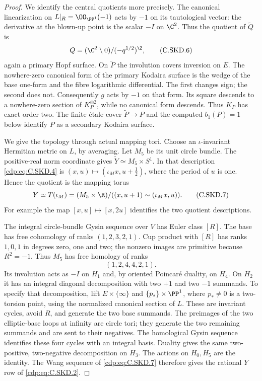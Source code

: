 \begin{proof}
We identify the central quotients more precisely.
The canonical linearization on
$L|_R=\OO_{\PP^1}(-1)$ acts by $-1$ on its
tautological vector: the derivative at the
blown-up point is the scalar $-I$ on $\C^2$.
Thus the quotient of $\widetilde Q$ is
\[
                 Q=(\C^2\setminus0)/
                         (-q^{1/2})^{\Z},              \tag{C.SKD.6}\label{cdp:eq:C.SKD.6}
\]
again a primary Hopf surface. On $\widetilde P$
the involution covers inversion on $E$.
The nowhere-zero canonical form of the primary
Kodaira surface is the wedge of the base
one-form and the fibre logarithmic differential.
The first changes sign; the second does not.
Consequently $g$ acts by $-1$ on that form.
Its square descends to a nowhere-zero section
of $K_P^{\otimes2}$, while no canonical form
descends. Thus $K_P$ has exact order two.
The finite \'etale cover $\widetilde P\to P$
and the computed $b_1(P)=1$ below identify $P$
as a secondary Kodaira surface.

We give the topology through actual mapping
tori. Choose an $\iota$-invariant Hermitian
metric on $L$, by averaging. Let $M_5$ be its
unit circle bundle. The positive-real norm
coordinate gives
$\widetilde Y\simeq M_5\times S^1$. In that
description \eqref{cdp:eq:C.SKD.4} is
$(x,u)\mapsto(\iota_Mx,u+\tfrac12)$, where
the period of $u$ is one. Hence the quotient
is the mapping torus
\[
          Y\simeq T(\iota_M)
            =(M_5\times\R)/
               ((x,u+1)\sim(\iota_Mx,u)).               \tag{C.SKD.7}\label{cdp:eq:C.SKD.7}
\]
For example the map $[x,u]\mapsto[x,2u]$
identifies the two quotient descriptions.

The integral circle-bundle Gysin sequence
over $V$ has Euler class $[R]$. The base has
free cohomology of ranks $(1,2,3,2,1)$.
Cup product with $[R]$ has ranks $1,0,1$
in degrees zero, one and two; the nonzero
images are primitive because $R^2=-1$.
Thus $M_5$ has free homology of ranks
\[
                         (1,2,4,4,2,1).                \tag{C.SKD.8}\label{cdp:eq:C.SKD.8}
\]
Its involution acts as $-I$ on $H_1$ and,
by oriented Poincar\'e duality, on $H_4$.
On $H_2$ it has an integral diagonal
decomposition with two $+1$ and two $-1$
summands. To specify that decomposition,
lift $E\times\{\infty\}$ and
$\{p_*\}\times\PP^1$, where $p_*\ne0$ is
a two-torsion point, using the normalized
canonical section of $L$. These are
invariant cycles, avoid $R$, and generate
the two base summands. The preimages of
the two elliptic-base loops at infinity
are circle tori; they generate the two
remaining summands and are sent to their
negatives. The homological Gysin sequence
identifies these four cycles with an
integral basis. Duality gives the same
two-positive, two-negative decomposition
on $H_3$. The actions on $H_0,H_5$ are
the identity. The Wang sequence of
\eqref{cdp:eq:C.SKD.7} therefore gives the rational
$Y$ row of \eqref{cdp:eq:C.SKD.2}.


\end{proof}
